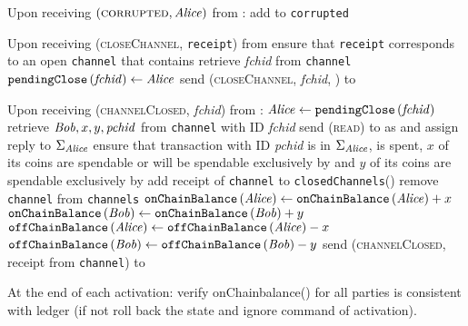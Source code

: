 \begin{functionality}{\fpaynet}
\begin{algorithmic}[1]
    \State Upon receiving $\left(\textsc{corrupted}, \mathit{Alice}\right)$ from
    \simulator:
    \Indent
      \State add \alice{} to \texttt{corrupted}
    \EndIndent
    \State

    \State Upon receiving (\textsc{closeChannel}, \texttt{receipt}) from \alice
     
    \Indent
      \State ensure that \texttt{receipt} corresponds to an open
      \texttt{channel} that contains \alice
      \State retrieve \textit{fchid} from \texttt{channel}
      \State $\mathtt{pendingClose}\left(\mathit{fchid}\right) \gets \mathit{Alice}$
      \State send (\textsc{closeChannel}, \textit{fchid}, \alice) to \simulator
    \EndIndent
    \State

    \State Upon receiving (\textsc{channelClosed}, \textit{fchid}) from
    \simulator:
    \Indent
      \State $\mathit{Alice} \gets \mathtt{pendingClose}\left(\mathit{fchid}\right)$
      \State retrieve $\mathit{Bob}, x, y, \mathit{pchid}$ from \texttt{channel}
      with ID \textit{fchid}
      \State send (\textsc{read}) to \ledger{} as \alice{} and assign reply to
      $\Sigma_{\mathit{Alice}}$
      \State ensure that transaction with ID \textit{pchid} is in
      $\Sigma_{\mathit{Alice}}$, is spent, $x$ of its coins are spendable or
      will be spendable exclusively by \alice{} and $y$ of its coins are
      spendable exclusively by \bob
      \State add receipt of \texttt{channel} to \texttt{closedChannels}(\bob)
      \State remove \texttt{channel} from \texttt{channels}
      \State $\mathtt{onChainBalance}\left(\mathit{Alice}\right) \gets
      \mathtt{onChainBalance}\left(\mathit{Alice}\right) + x$
      \State $\mathtt{onChainBalance}\left(\mathit{Bob}\right) \gets
      \mathtt{onChainBalance}\left(\mathit{Bob}\right) + y$
      \State $\mathtt{offChainBalance}\left(\mathit{Alice}\right) \gets
      \mathtt{offChainBalance}\left(\mathit{Alice}\right) - x$
      \State $\mathtt{offChainBalance}\left(\mathit{Bob}\right) \gets
      \mathtt{offChainBalance}\left(\mathit{Bob}\right) - y$
      \State send (\textsc{channelClosed}, receipt from \texttt{channel}) to
      \alice
    \EndIndent
    \State

    \State At the end of each activation: 
    \Indent
    \State verify  onChainbalance() for all parties is consistent with ledger (if not roll back the state and ignore command of activation).
    \EndIndent
  \end{algorithmic}
\end{functionality}
